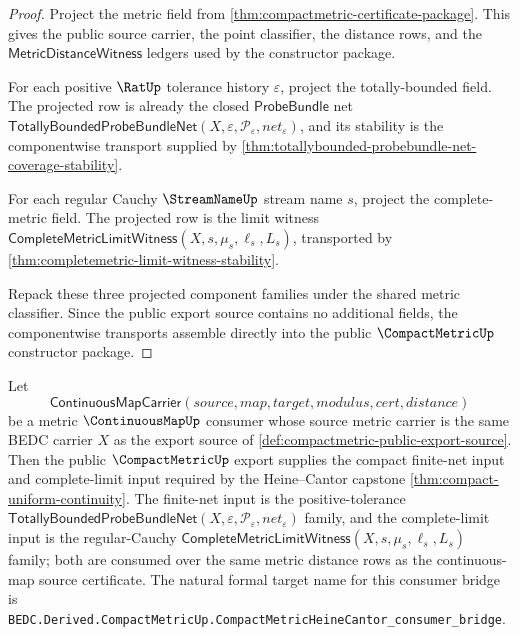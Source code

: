 \begin{proof}
Project the metric field from
\autoref{thm:compactmetric-certificate-package}. This gives the public source
carrier, the point classifier, the distance rows, and the
$\mathsf{MetricDistanceWitness}$ ledgers used by the constructor package.

For each positive $\RatUp$ tolerance history $\varepsilon$, project the
totally-bounded field. The projected row is already the closed
$\mathsf{ProbeBundle}$ net
$\mathsf{TotallyBoundedProbeBundleNet}(X,\varepsilon,\mathcal{P}_{\varepsilon},net_{\varepsilon})$,
and its stability is the componentwise transport supplied by
\autoref{thm:totallybounded-probebundle-net-coverage-stability}.

For each regular Cauchy $\StreamNameUp$ stream name $s$, project the
complete-metric field. The projected row is the limit witness
$\mathsf{CompleteMetricLimitWitness}(X,s,\mu_s,\ell_s,L_s)$, transported by
\autoref{thm:completemetric-limit-witness-stability}.

Repack these three projected component families under the shared metric
classifier. Since the public export source contains no additional fields, the
componentwise transports assemble directly into the public
$\CompactMetricUp$ constructor package.
\end{proof}

\begin{theorem}
\label{thm:compactmetric-heine-cantor-consumer-bridge}
Let
$$
\mathsf{ContinuousMapCarrier}(source,map,target,modulus,cert,distance)
$$
be a metric $\ContinuousMapUp$ consumer whose source metric carrier is the
same BEDC carrier $X$ as the export source of
\autoref{def:compactmetric-public-export-source}. Then the public
$\CompactMetricUp$ export supplies the compact finite-net input and
complete-limit input required by the Heine--Cantor capstone
\autoref{thm:compact-uniform-continuity}. The finite-net input is the
positive-tolerance
$\mathsf{TotallyBoundedProbeBundleNet}(X,\varepsilon,\mathcal{P}_{\varepsilon},net_{\varepsilon})$
family, and the complete-limit input is the regular-Cauchy
$\mathsf{CompleteMetricLimitWitness}(X,s,\mu_s,\ell_s,L_s)$ family; both are
consumed over the same metric distance rows as the continuous-map source
certificate. The natural formal target name for this consumer bridge is
\texttt{BEDC.Derived.CompactMetricUp.CompactMetricHeineCantor\_consumer\_bridge}.
\end{theorem}

